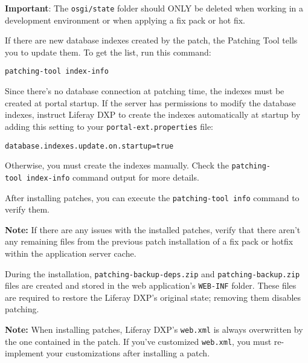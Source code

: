 \noindent\hrulefill

\noindent\hrulefill

\textbf{Important}: The \texttt{osgi/state} folder should ONLY be
deleted when working in a development environment or when applying a fix
pack or hot fix.

\noindent\hrulefill

If there are new database indexes created by the patch, the Patching
Tool tells you to update them. To get the list, run this command:

\begin{verbatim}
patching-tool index-info
\end{verbatim}

Since there's no database connection at patching time, the indexes must
be created at portal startup. If the server has permissions to modify
the database indexes, instruct Liferay DXP to create the indexes
automatically at startup by adding this setting to your
\texttt{portal-ext.properties} file:

\begin{verbatim}
database.indexes.update.on.startup=true
\end{verbatim}

Otherwise, you must create the indexes manually. Check the
\texttt{patching-tool\ index-info} command output for more details.

After installing patches, you can execute the
\texttt{patching-tool\ info} command to verify them.

\noindent\hrulefill

\textbf{Note:} If there are any issues with the installed patches,
verify that there aren't any remaining files from the previous patch
installation of a fix pack or hotfix within the application server
cache.

\noindent\hrulefill

During the installation, \texttt{patching-backup-deps.zip} and
\texttt{patching-backup.zip} files are created and stored in the web
application's \texttt{WEB-INF} folder. These files are required to
restore the Liferay DXP's original state; removing them disables
patching.

\noindent\hrulefill

\textbf{Note:} When installing patches, Liferay DXP's \texttt{web.xml}
is always overwritten by the one contained in the patch. If you've
customized \texttt{web.xml}, you must re-implement your customizations
after installing a patch.

